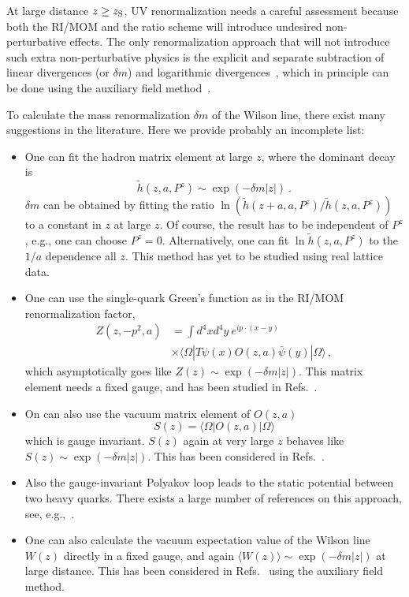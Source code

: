 \documentclass[preprint,12pt]{elsarticle}
\newcommand{\nn}{\nonumber}
\begin{document}
At large distance $z\ge z_{\rm S}$, UV renormalization
needs a careful assessment because both the RI/MOM and the ratio scheme will introduce
undesired non-perturbative effects.
The only renormalization approach that will not introduce such extra non-perturbative physics
is the explicit and separate subtraction of linear divergences (or $\delta m$)
and logarithmic divergences~\cite{Chen:2016fxx,Ji:2017oey,Ishikawa:2017faj,Green:2017xeu},
which in principle can be done using the auxiliary field method~\cite{Green:2017xeu,Green:2020xco}.

To calculate the mass renormalization $\delta m$
of the Wilson line, there exist many
suggestions in the literature. Here we provide probably an incomplete list:

\begin{itemize}
\item{One can fit the hadron matrix element
at large $z$, where the dominant decay is
\begin{equation}\label{eq:mass1}
  \tilde h(z,a, P^z) \sim \exp(-\delta m |z|) \ .
\end{equation}
$\delta m$ can be obtained by fitting the ratio $\ln (\tilde h(z+a,a, P^z)/\tilde h(z,a, P^z))$
to a constant in $z$ at large $z$. Of course, the result has to be independent of $P^z$,
e.g., one can choose $P^z=0$. Alternatively, one can fit $\ln \tilde h(z,a, P^z)$ to the $1/a$
dependence all $z$. This method has yet to be studied using real lattice data.}
\item{One can use the single-quark Green's function
as in the RI/MOM renormalization factor,
\begin{align}
          Z(z,-p^2,a)&=\int d^4x d^4y\ e^{ip\cdot (x-y)}\nn\\
          &\times  \langle \Omega|T\psi(x) O(z,a) \bar{\psi}(y)|\Omega\rangle\,,
\end{align}
which asymptotically goes like $Z(z) \sim \exp(-\delta m |z|)$. This matrix element needs a fixed gauge,
and has been studied in Refs.~\cite{Izubuchi:2019lyk,Huo:2019vdl}.}
\item{On can also use the vacuum matrix element of $O(z,a)$
\begin{equation}
        S(z) = \langle \Omega|O(z,a)|\Omega\rangle
\end{equation}
which is gauge invariant. $S(z)$ again at very large $z$ behaves like
$S(z) \sim \exp(-\delta m |z|)$. This has been considered in Refs.~\cite{Braun:2018brg,Li:2020xml}.
}
\item{Also the gauge-invariant Polyakov loop leads to the static potential between two heavy quarks. There exists a large number of references on this approach, see, e.g.,~\cite{Appelquist:1977tw,Schroder:1999xf,Smirnov:2009fh,Philipsen:2002az,Jahn:2004qr}.}
\item{One can also calculate the vacuum expectation value
of the Wilson line $W(z)$ directly in a fixed gauge,
and again $\langle W(z) \rangle \sim \exp(-\delta m |z|)$ at large distance. This has been considered in Refs.~\cite{Green:2017xeu,Green:2020xco} using the auxiliary field method.}
\end{itemize}
\end{document}

